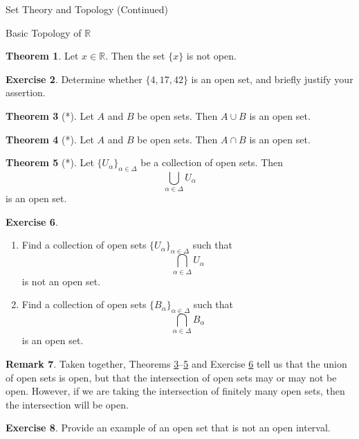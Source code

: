 \documentclass[11pt]{article}
\theoremstyle{definition}
\newtheorem{theorem}{Theorem}[section]
\newtheorem{exercise}[theorem]{Exercise}
\newtheorem{remark}[theorem]{Remark}
\begin{document}
\begin{section}{Set Theory and Topology (Continued)}
\begin{subsection}{Basic Topology of $\mathbb{R}$}
\begin{theorem}
Let $x\in\mathbb{R}$.  Then the set $\{x\}$ is not open.
\end{theorem}

\begin{exercise} 
Determine whether $\{4,17,42\}$ is an open set, and briefly justify your assertion. 
\end{exercise}

\begin{theorem}[*]\label{finite union of open sets}
Let $A$ and $B$ be open sets.  Then $A\cup B$ is an open set. 
\end{theorem}

\begin{theorem}[*]\label{finite intersection of open sets}
Let $A$ and $B$ be open sets.  Then $A\cap B$ is an open set.
\end{theorem}

\begin{theorem}[*]\label{union of open sets}
Let $\{U_{\alpha}\}_{\alpha\in\Delta}$ be a collection of open sets.  Then
\[
\bigcup_{\alpha\in\Delta} U_{\alpha}
\]
is an open set.
\end{theorem}

\begin{exercise}\label{intersection of open sets}\
\begin{enumerate}
\item Find a collection of open sets $\{U_{\alpha}\}_{\alpha\in\Delta}$ such that
\[
\bigcap_{\alpha\in\Delta} U_{\alpha}
\]
is not an open set.
\item Find a collection of open sets $\{B_{\alpha}\}_{\alpha\in\Delta}$ such that
\[
\bigcap_{\alpha\in\Delta} B_{\alpha}
\]
is an open set.
\end{enumerate}
\end{exercise}

\begin{remark}
Taken together, Theorems \ref{finite union of open sets}--\ref{union of open sets} and Exercise \ref{intersection of open sets} tell us that the union of open sets is open, but that the intersection of open sets may or may not be open.  However, if we are taking the intersection of finitely many open sets, then the intersection will be open.
\end{remark}

\begin{exercise}
Provide an example of an open set that is not an open interval.
\end{exercise}


\end{subsection}
\end{section}
\end{document}
